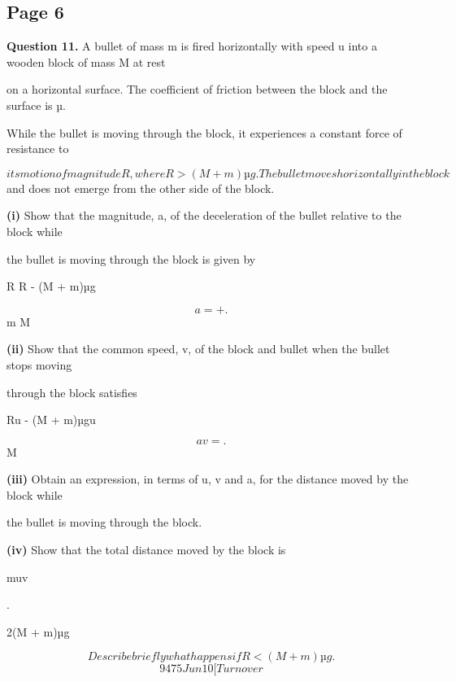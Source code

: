 \documentclass[12pt]{article}
\begin{document}
\subsection*{Page 6}
\begin{flushleft}
\bigskip\textbf{Question 11.} A bullet of mass m is fired horizontally with speed u into a wooden block of mass M at rest\par
on a horizontal surface. The coefficient of friction between the block and the surface is µ.\par
While the bullet is moving through the block, it experiences a constant force of resistance to\par
\[its motion of magnitude R, where R > (M + m)µg. The bullet moves horizontally in the block\]
and does not emerge from the other side of the block.\par
\textbf{(i)} Show that the magnitude, a, of the deceleration of the bullet relative to the block while\par
the bullet is moving through the block is given by\par
R R - (M + m)µg\par
\[a = + .\]
m M\par
\textbf{(ii)} Show that the common speed, v, of the block and bullet when the bullet stops moving\par
through the block satisfies\par
Ru - (M + m)µgu\par
\[av = .\]
M\par
\textbf{(iii)} Obtain an expression, in terms of u, v and a, for the distance moved by the block while\par
the bullet is moving through the block.\par
\textbf{(iv)} Show that the total distance moved by the block is\par
muv\par
.\par
2(M + m)µg\par
\[Describe briefly what happens if R < (M + m)µg.\]
\[9475 Jun10 [Turn over\]
\end{flushleft}
\end{document}
